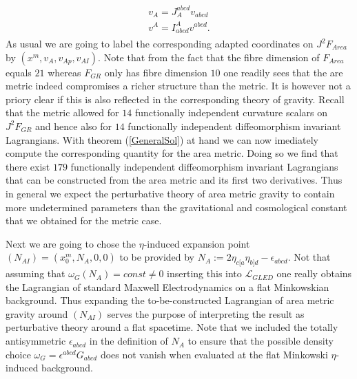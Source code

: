 \documentclass[a4paper,12pt, DIV=14, BCOR=5mm, twoside, headsepline]{scrbook}
\begin{document}
\begin{align}
    \begin{aligned}
    v_A = J_A^{abcd}v_{abcd} \\
    v^A = I^A_{abcd}v^{abcd}.
    \end{aligned}
\end{align}
As usual we are going to label the corresponding adapted coordinates on $J^2F_{Area}$ by $(x^m,v_A,v_{Ap},v_{AI})$. 
Note that from the fact that the fibre dimension of $F_{Area}$ equals $21$ whereas $F_{GR}$ only has fibre dimension $10$ one readily sees that the are metric indeed compromises a richer structure than the metric. It is however not a priory clear if this is also reflected in the corresponding theory of gravity. Recall that the metric allowed for $14$ functionally independent curvature scalars on $J^2F_{GR}$ and hence also for $14$ functionally independent diffeomorphism invariant Lagrangians. With theorem (\ref{GeneralSol}) at hand we can now imediately compute the corresponding quantity for the area metric. Doing so we find that there exist $179$ functionally independent diffeomorphism invariant Lagrangians that can be constructed from the area metric and its first two derivatives. Thus in general we expect the perturbative theory of area metric gravity to contain more undetermined parameters than the gravitational and cosmological constant that we obtained for the metric case.


Next we are going to chose the $\eta$-induced expansion point $(N_{AI}) = (x_0^m, N_A, 0,0)$ to be provided by $N_A := 2 \eta_{c[a} \eta_{b]d} - \epsilon_{abcd}$. Not that assuming that $\omega_G(N_A) = const \neq 0$ inserting this into $\mathcal{L}_{GLED}$ one really obtains the Lagrangian of standard Maxwell Electrodynamics on a flat Minkowskian background. Thus expanding the to-be-constructed Lagrangian of area metric gravity around $(N_{AI})$ serves the purpose of interpreting the result as perturbative theory around a flat spacetime. Note that we included the totally antisymmetric $\epsilon_{abcd}$ in the definition of $N_A$ to ensure that  the possible density choice $\omega_G = \epsilon^{abcd}G_{abcd}$ does not vanish when evaluated at the flat Minkowski $\eta$-induced background. 
\end{document}
